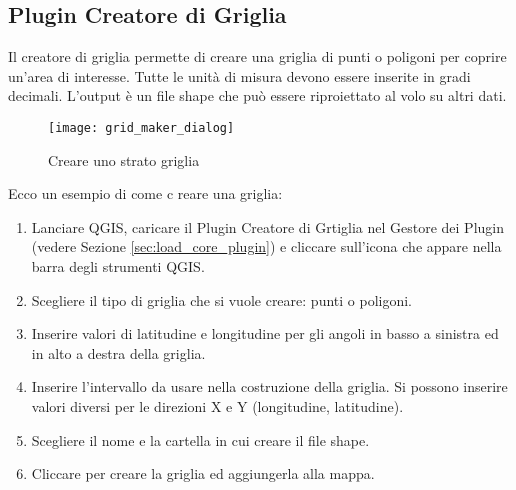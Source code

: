 
\subsection{Plugin Creatore di Griglia}


Il creatore di griglia permette di creare una griglia di punti o poligoni per coprire un'area di interesse.
Tutte le unità di misura devono essere inserite in gradi decimali.
L'output è un file shape che può essere riproiettato al volo su altri dati.

\begin{figure}[ht]
\begin{center}
  \caption{Creare uno strato griglia \nixcaption}\label{fig:graticule}\smallskip
  \texttt{[image: grid\_maker\_dialog]}
\end{center}
\end{figure}

Ecco un esempio di come c reare una griglia:

\begin{enumerate}
\item Lanciare QGIS, caricare il Plugin Creatore di Grtiglia nel Gestore dei Plugin (vedere Sezione 
\ref{sec:load_core_plugin}) e cliccare sull'icona  che appare nella barra degli strumenti QGIS.
\item Scegliere il tipo di griglia che si vuole creare: punti o poligoni.
\item Inserire valori di latitudine e longitudine per gli angoli in basso a sinistra ed in alto a destra della griglia.
\item Inserire l'intervallo da usare nella costruzione della griglia. Si possono inserire valori diversi per le direzioni X e Y (longitudine, latitudine).
\item Scegliere il nome e la cartella in cui creare il file shape.
\item Cliccare  per creare la griglia ed aggiungerla alla mappa.
\end{enumerate} 


